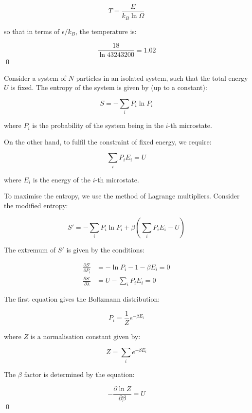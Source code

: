 \documentclass[12pt]{article}
\begin{document}
\begin{equation}
    T = \frac{E}{k_{B}\ln{\Omega}}
\end{equation}

so that in terms of $\epsilon/k_{B}$, the temperature is:

\begin{equation}
    \frac{18}{\ln{43243200}} = 1.02
\end{equation}
\qed


Consider a system of $N$ particles in an isolated system, such that the total energy $U$ is fixed. The entropy of the system is given by (up to a constant):

\begin{equation}
    S = -\sum_{i} P_{i}\ln{P_{i}}
\end{equation}

where $P_{i}$ is the probability of the system being in the $i$-th microstate.

On the other hand, to fulfil the constraint of fixed energy, we require:

\begin{equation}
    \sum_{i} P_{i}E_{i} = U
\end{equation}

where $E_{i}$ is the energy of the $i$-th microstate.

To maximise the entropy, we use the method of Lagrange multipliers. Consider the modified entropy:

\begin{equation}
    S' = -\sum_{i} P_{i}\ln{P_{i}} + \beta\left( \sum_{i} P_{i}E_{i} - U \right)
\end{equation}

The extremum of $S'$ is given by the conditions:

\begin{equation}
\begin{split}
    \frac{\partial S'}{\partial P_{i}} &= -\ln{P_{i}} - 1 - \beta E_{i} = 0 \\
    \frac{\partial S'}{\partial \lambda} &= U - \sum_{i} P_{i}E_{i} = 0
\end{split}
\end{equation}

The first equation gives the Boltzmann distribution:

\begin{equation}
    P_{i} = \frac{1}{Z}e^{-\beta E_{i}}
\end{equation}

where $Z$ is a normalisation constant given by:

\begin{equation}
    Z = \sum_{i} e^{-\beta E_{i}}
\end{equation}

The $\beta$ factor is determined by the equation:

\begin{equation}
    -\frac{\partial \ln{Z}}{\partial \beta} = U
\end{equation}
\qed
\end{document}
